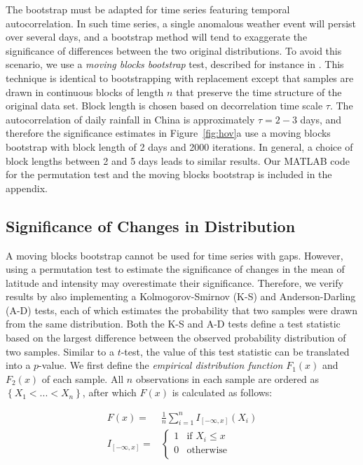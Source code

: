 \documentclass[9pt,twocolumn,twoside,lineno]{pnas-new}
\begin{document}
	The bootstrap must be adapted for time series featuring temporal autocorrelation. In such time series, a single anomalous weather event will persist over several days, and a bootstrap method will tend to exaggerate the significance of differences between the two original distributions. To avoid this scenario, we use a \textit{moving blocks bootstrap} test, described for instance in \citet{Singh2014}. This technique is identical to bootstrapping with replacement except that samples are drawn in continuous blocks of length $n$ that preserve the time structure of the original data set. Block length is chosen based on decorrelation time scale $\tau$. The autocorrelation of daily rainfall in China is approximately $\tau =2-3$ days, and therefore the significance estimates in Figure~\ref{fig:hov}a use a moving blocks bootstrap with block length of 2 days and 2000 iterations. In general, a choice of block lengths between 2 and 5 days leads to similar results. Our MATLAB code for the permutation test and the moving blocks bootstrap is included in the appendix.
	
\subsection{Significance of Changes in Distribution}

	A moving blocks bootstrap cannot be used for time series with gaps. However, using a permutation test to estimate the significance of changes in the mean of latitude and intensity may overestimate their significance. Therefore, we verify results by also implementing a Kolmogorov-Smirnov (K-S) and Anderson-Darling (A-D) tests, each of which estimates the probability that two samples were drawn from the same distribution. Both the K-S and A-D tests define a test statistic based on the largest difference between the observed probability distribution of two samples. Similar to a $t$-test, the value of this test statistic can be translated into a $p$-value. We first define the \textit{empirical distribution function} $F_1(x)$ and $F_2(x)$ of each sample. All $n$ observations in each sample are ordered as $\left\{X_1 < ... < X_n\right\}$, after which $F(x)$ is calculated as follows:

\begin{align}
	F(x) =& \frac{1}{n}\sum_{i=1}^n I_{[-\infty,x]} (X_i) \\
	I_{[-\infty,x]} =& 
	\begin{cases}
   		 1 & \text{if } X_i \leq x\\
    		0 & \text{otherwise} \\
    	\end{cases}
\end{align}
\end{document}
